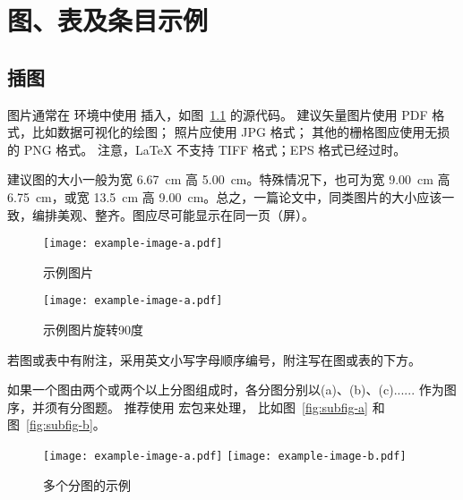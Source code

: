 
\chapter{图、表及条目示例}

\section{插图}

图片通常在  环境中使用  插入，如图~\ref{fig:example} 的源代码。
建议矢量图片使用 PDF 格式，比如数据可视化的绘图；
照片应使用 JPG 格式；
其他的栅格图应使用无损的 PNG 格式。
注意，LaTeX 不支持 TIFF 格式；EPS 格式已经过时。

建议图的大小一般为宽 \SI{6.67}{\centi\meter} \times 高 \SI{5.00}{\centi\meter}。特殊情况下，也可为宽 \SI{9.00}{\centi\meter} \times 高 \SI{6.75}{\centi\meter}，或宽 \SI{13.5}{\centi\meter} \times 高 \SI{9.00}{\centi\meter}。总之，一篇论文中，同类图片的大小应该一致，编排美观、整齐。图应尽可能显示在同一页（屏）。

\begin{figure}
  \centering
  \texttt{[image: example-image-a.pdf]}
  \caption{示例图片}
  \label{fig:example}
\end{figure}

\begin{figure}
  \centering
  \texttt{[image: example-image-a.pdf]}
  \caption{示例图片旋转90度}
  \label{fig:exampleRotate90}
\end{figure}

若图或表中有附注，采用英文小写字母顺序编号，附注写在图或表的下方。

如果一个图由两个或两个以上分图组成时，各分图分别以(a)、(b)、(c)...... 作为图序，并须有分图题。
推荐使用  宏包来处理， 比如图~\ref{fig:subfig-a} 和图~\ref{fig:subfig-b}。

\begin{figure}
  \centering
    {\texttt{[image: example-image-a.pdf]}}
    {\texttt{[image: example-image-b.pdf]}}
  \caption{多个分图的示例}
  \label{fig:multi-image}
\end{figure}




